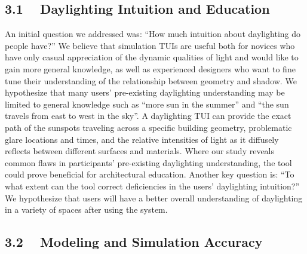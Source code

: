\documentclass{article}
\begin{document}
\subsection{3.1 ~ Daylighting Intuition and Education}

An initial question we addressed was: ``How much intuition about
daylighting do people have?''  We believe that simulation TUIs are
useful both for novices who have only casual appreciation of the
dynamic qualities of light and would like to gain more general
knowledge, as well as experienced designers who want to fine tune
their understanding of the relationship between geometry and shadow.
We hypothesize that many users' pre-existing daylighting understanding
may be limited to general knowledge such as ``more sun in the summer''
and ``the sun travels from east to west in the sky''.  A daylighting
TUI can provide the exact path of the sunspots traveling across a
specific building geometry, problematic glare locations and times, and
the relative intensities of light as it diffusely reflects between
different surfaces and materials.  Where our study reveals common
flaws in participants' pre-existing daylighting understanding, the
tool could prove beneficial for architectural education.  Another key
question is: ``To what extent can the tool correct deficiencies in the
users' daylighting intuition?''  We hypothesize that users will have a
better overall understanding of daylighting in a variety of spaces
after using the system.





\subsection{3.2 ~ Modeling and Simulation Accuracy}
\end{document}
